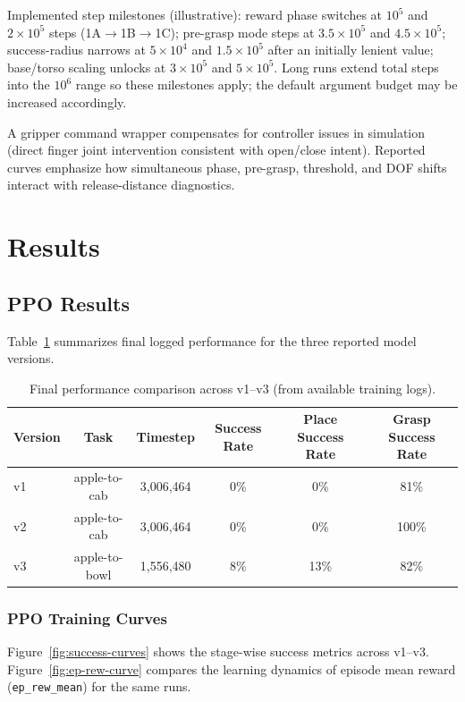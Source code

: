 \documentclass[11pt,a4paper]{article}
\begin{document}
\noindent Implemented step milestones (illustrative): reward phase switches at \(10^{5}\) and \(2\times10^{5}\) steps (1A\(\rightarrow\)1B\(\rightarrow\)1C); pre-grasp mode steps at \(3.5\times10^{5}\) and \(4.5\times10^{5}\); success-radius narrows at \(5\times10^{4}\) and \(1.5\times10^{5}\) after an initially lenient value; base/torso scaling unlocks at \(3\times10^{5}\) and \(5\times10^{5}\). Long runs extend total steps into the \(10^{6}\) range so these milestones apply; the default argument budget may be increased accordingly.

\noindent A gripper command wrapper compensates for controller issues in simulation (direct finger joint intervention consistent with open/close intent). Reported curves emphasize how simultaneous phase, pre-grasp, threshold, and DOF shifts interact with release-distance diagnostics.

\section{Results}
\subsection{PPO Results}
Table~\ref{tab:main} summarizes final logged performance for the three reported model versions.

\begin{table}[h]
\centering
\caption{Final performance comparison across v1--v3 (from available training logs).}
\label{tab:main}
\begin{tabular}{@{}lccccc@{}}
\toprule
Version & Task & Timestep & Success Rate & Place Success Rate & Grasp Success Rate \\
\midrule
v1 & apple-to-cab & 3,006,464 & 0\% & 0\% & 81\% \\
v2 & apple-to-cab & 3,006,464 & 0\% & 0\% & 100\% \\
v3 & apple-to-bowl & 1,556,480 & 8\% & 13\% & 82\% \\
\bottomrule
\end{tabular}
\end{table}

\subsubsection{PPO Training Curves}
Figure~\ref{fig:success-curves} shows the stage-wise success metrics across v1--v3. Figure~\ref{fig:ep-rew-curve} compares the learning dynamics of episode mean reward (\texttt{ep\_rew\_mean}) for the same runs.
\end{document}

